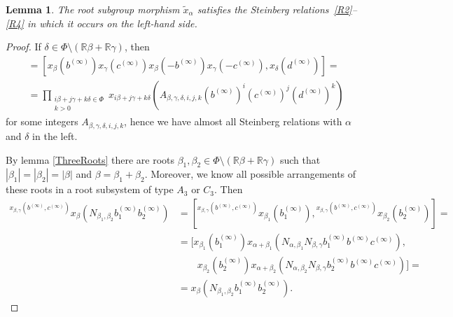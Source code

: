 \documentclass{article}
\numberwithin{equation}{section}
\newtheorem{lemma}{Lemma} \numberwithin{lemma}{section}
\theoremstyle{definition}
\theoremstyle{remark}
\newcommand{\up}[2]{{^{#1}\!{#2}}}
\begin{document}
 \begin{lemma} \label{lem:elim-lhs}
 The root subgroup morphism $\widetilde{x}_\alpha$ satisfies the Steinberg relations~\eqref{R2}--\eqref{R4} in which it occurs on the left-hand side.
\end{lemma}
\begin{proof}
 
 If \(\delta \in \Phi \setminus (\mathbb R \beta + \mathbb R \gamma)\), then
 \begin{align*}
  [x_{\beta, \gamma}(b^{(\infty)}, c^{(\infty)}),
  x_\delta(d^{(\infty)})]
  &= [x_\beta(b^{(\infty)}) x_\gamma(c^{(\infty)})
   x_\beta(-b^{(\infty)}) x_\gamma(-c^{(\infty)}),
  x_\delta(d^{(\infty)})] =\\
  &= \prod_{\substack{i\beta + j\gamma + k\delta \in \Phi\\ k > 0}}
  x_{i\beta + j\gamma + k\delta}
   (A_{\beta, \gamma, \delta, i, j, k}
   (b^{(\infty)})^i (c^{(\infty)})^j (d^{(\infty)})^k)
 \end{align*}
 for some integers \(A_{\beta, \gamma, \delta, i, j, k}\),
 hence we have almost all Steinberg relations with \(\alpha\) and \(\delta\) in the left.

By lemma \ref{ThreeRoots} there are roots \(\beta_1, \beta_2 \in \Phi \setminus (\mathbb R \beta + \mathbb R \gamma)\) such that \(|\beta_1| = |\beta_2| = |\beta|\) and \(\beta = \beta_1 + \beta_2\). Moreover, we know all possible arrangements of these roots in a root subsystem of type \(A_3\) or \(C_3\). Then
 \begin{align*}
  \up{x_{\beta, \gamma}(b^{(\infty)}, c^{(\infty)})}
  {x_\beta(N_{\beta_1, \beta_2}
   b_1^{(\infty)} b_2^{(\infty)})}
  &= [\up{x_{\beta, \gamma}(b^{(\infty)}, c^{(\infty)})}
   {x_{\beta_1}(b_1^{(\infty)})},
  \up{x_{\beta, \gamma}(b^{(\infty)}, c^{(\infty)})}
   {x_{\beta_2}(b_2^{(\infty)})}] =\\
  &= [x_{\beta_1}(b_1^{(\infty)})
   x_{\alpha + \beta_1}(N_{\alpha, \beta_1} N_{\beta, \gamma}
   b_1^{(\infty)} b^{(\infty)} c^{(\infty)}),\\
  &\qquad x_{\beta_2}(b_2^{(\infty)})
   x_{\alpha + \beta_2}(N_{\alpha, \beta_2} N_{\beta, \gamma}
   b_2^{(\infty)} b^{(\infty)} c^{(\infty)})] =\\
  &= x_\beta(N_{\beta_1, \beta_2} b_1^{(\infty)} b_2^{(\infty)}).
 \end{align*}


\end{proof}
\end{document}
